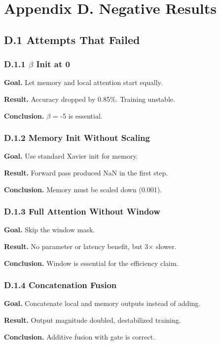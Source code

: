 \section{Appendix D. Negative Results}

\subsection{D.1 Attempts That Failed}

\subsubsection{D.1.1 $\beta$ Init at 0}

\textbf{Goal.} Let memory and local attention start equally.

\textbf{Result.} Accuracy dropped by 0.85\%. Training unstable.

\textbf{Conclusion.} $\beta$ = -5 is essential.

\subsubsection{D.1.2 Memory Init Without Scaling}

\textbf{Goal.} Use standard Xavier init for memory.

\textbf{Result.} Forward pass produced NaN in the first step.

\textbf{Conclusion.} Memory must be scaled down (0.001).

\subsubsection{D.1.3 Full Attention Without Window}

\textbf{Goal.} Skip the window mask.

\textbf{Result.} No parameter or latency benefit, but 3$\times$ slower.

\textbf{Conclusion.} Window is essential for the efficiency claim.

\subsubsection{D.1.4 Concatenation Fusion}

\textbf{Goal.} Concatenate local and memory outputs instead of adding.

\textbf{Result.} Output magnitude doubled, destabilized training.

\textbf{Conclusion.} Additive fusion with gate is correct.

